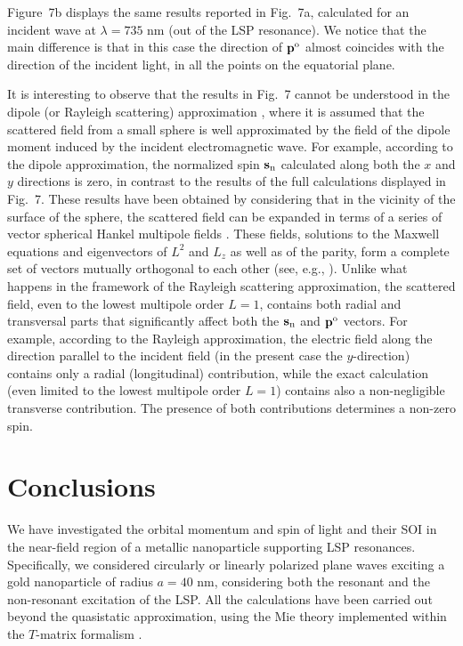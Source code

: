 \documentclass[journal=apchd5,manuscript=article]{achemso}
\begin{document}
Figure~7b displays the same results reported in Fig.~7a, calculated for an incident wave at  $\lambda = 735$ nm (out of the LSP resonance). We notice that the main difference is that in this case the direction of ${\bf p}^{\rm o}$ almost coincides with the direction of the incident light, in all the points on the equatorial plane.

It is interesting to observe that the  results in Fig.~7 cannot be understood in the dipole (or 
Rayleigh scattering) approximation \cite{Maier2007a}, where it is assumed that the scattered field from a small sphere is well approximated by the field of the dipole moment induced by the incident electromagnetic wave.
For example, according to the dipole approximation, the normalized spin ${\bf s}_{\rm n}$ calculated along  both the $x$ and $y$ directions is zero, in contrast to the results of the full calculations displayed in Fig.~7.
These results have been obtained  by considering that in the vicinity of the surface of the sphere, the scattered field can be expanded in terms of a series of vector spherical Hankel multipole fields \cite{borghese2007scattering}. These fields, solutions to the Maxwell equations and eigenvectors of $L^2$ and $L_z$ as well as of the parity, form a complete set of vectors mutually orthogonal to each other (see, e.g., \cite{borghese2007scattering}).  Unlike what happens in the framework of the Rayleigh scattering approximation, the scattered field, even to the lowest multipole order $L=1$, contains both  radial and transversal parts that significantly affect both the ${\bf s}_{\rm n}$ and ${\bf p}^{\rm o}$ vectors. For example, according to the Rayleigh approximation, the electric field along the direction parallel to the incident field (in the present case the $y$-direction) contains only a radial (longitudinal) contribution, while the exact calculation (even limited to the lowest multipole order $L=1$) contains also a non-negligible  transverse contribution. The presence of both contributions determines a non-zero spin.
\newpage
\section*{Conclusions}

We have investigated the orbital momentum and spin of light and their SOI in the near-field region of a metallic nanoparticle supporting LSP resonances. 
Specifically, we considered circularly or linearly polarized plane waves exciting a gold nanoparticle of radius $a= 40$ nm, considering both the resonant and the non-resonant excitation of the LSP.  All the calculations have been carried out beyond the quasistatic approximation, using the Mie theory implemented within the $T$-matrix formalism \cite{borghese2007scattering}.
\end{document}
